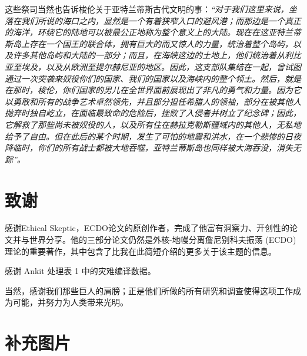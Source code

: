 \documentclass[10pt,twocolumn,letterpaper]{article}
\begin{document}
这些祭司当然也告诉梭伦关于亚特兰蒂斯古代文明的事：\textit{“对于我们这里来说，坐落在我们所说的海口之内，显然是一个有着狭窄入口的避风港；而那边是一个真正的海洋，环绕它的陆地可以被最公正地称为整个意义上的大陆。现在在这亚特兰蒂斯岛上存在一个国王的联合体，拥有巨大的而又惊人的力量，统治着整个岛屿，以及许多其他岛屿和大陆的一部分；而且，在海峡这边的土地上，他们统治着从利比亚至埃及，以及从欧洲至提尔赫尼亚的地区。因此，这支部队集结在一起，曾试图通过一次突袭来奴役你们的国家、我们的国家以及海峡内的整个领土。然后，就是在那时，梭伦，你们国家的男儿在全世界面前展现出了非凡的勇气和力量。因为它以勇敢和所有的战争艺术卓然领先，并且部分担任希腊人的领袖，部分在被其他人抛弃时独自屹立，在面临最致命的危险后，挫败了入侵者并树立了纪念碑；因此，它解救了那些尚未被奴役的人，以及所有住在赫拉克勒斯疆域内的其他人，无私地给予了自由。但在此后的某个时期，发生了可怕的地震和洪水，在一个悲惨的日夜降临时，你们的所有战士都被大地吞噬，亚特兰蒂斯岛也同样被大海吞没，消失无踪”。}

\section{致谢}

感谢Ethical Skeptic，ECDO论文的原创作者，完成了他富有洞察力、开创性的论文并与世界分享。他的三部分论文\cite{1}仍然是外核-地幔分离詹尼别科夫振荡 (ECDO) 理论的重要著作，其中包含了比我在此简短介绍的更多关于该主题的信息。

感谢 Ankit 处理表 1 中的灾难编译数据。

当然，感谢我们那些巨人的肩膀；正是他们所做的所有研究和调查使得这项工作成为可能，并努力为人类带来光明。

\clearpage
\twocolumn

\section{补充图片}
\end{document}
